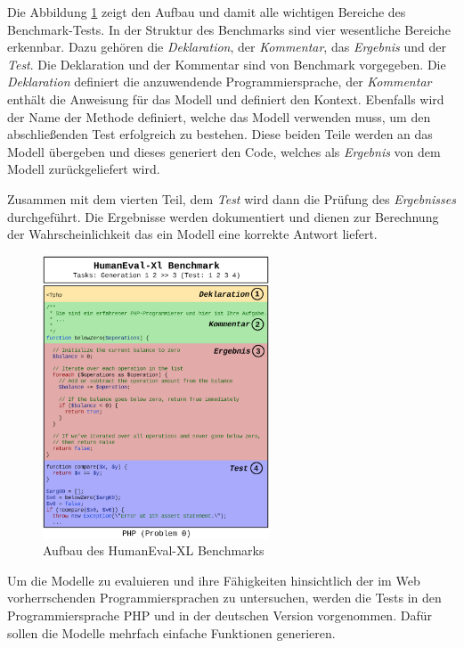 Die Abbildung \ref{img:code_generation_humaneval} zeigt den Aufbau und damit alle wichtigen Bereiche des Benchmark-Tests. In der Struktur des Benchmarks sind vier wesentliche Bereiche erkennbar. Dazu gehören die \textit{Deklaration}, der \textit{Kommentar}, das \textit{Ergebnis} und der \textit{Test}. Die Deklaration und der Kommentar sind von Benchmark vorgegeben. Die \textit{Deklaration} definiert die anzuwendende Programmiersprache, der \textit{Kommentar} enthält die Anweisung für das Modell und definiert den Kontext. Ebenfalls wird der Name der Methode definiert, welche das Modell verwenden muss, um den abschließenden Test erfolgreich zu bestehen. Diese beiden Teile werden an das Modell übergeben und dieses generiert den Code, welches als \textit{Ergebnis} von dem Modell zurückgeliefert wird.\vspace{0.2cm}

Zusammen mit dem vierten Teil, dem \textit{Test} wird dann die Prüfung des \textit{Ergebnisses} durchgeführt. Die Ergebnisse werden dokumentiert und dienen zur Berechnung der Wahrscheinlichkeit das ein Modell eine korrekte Antwort liefert.\vspace{0.2cm}

\begin{figure}[!ht]
	\includegraphics[width=0.6\textwidth]{content/chapter_intruduction/images/code_generation_humaneval_x.eps}
	\centering
	\caption{Aufbau des HumanEval-XL Benchmarks}
	\label{img:code_generation_humaneval}
\end{figure}

Um die Modelle zu evaluieren und ihre Fähigkeiten hinsichtlich der im Web vorherrschenden Programmiersprachen zu untersuchen, werden die Tests in den Programmiersprache PHP und in der deutschen Version vorgenommen. Dafür sollen die Modelle mehrfach einfache Funktionen generieren.\vspace{0.2cm}

